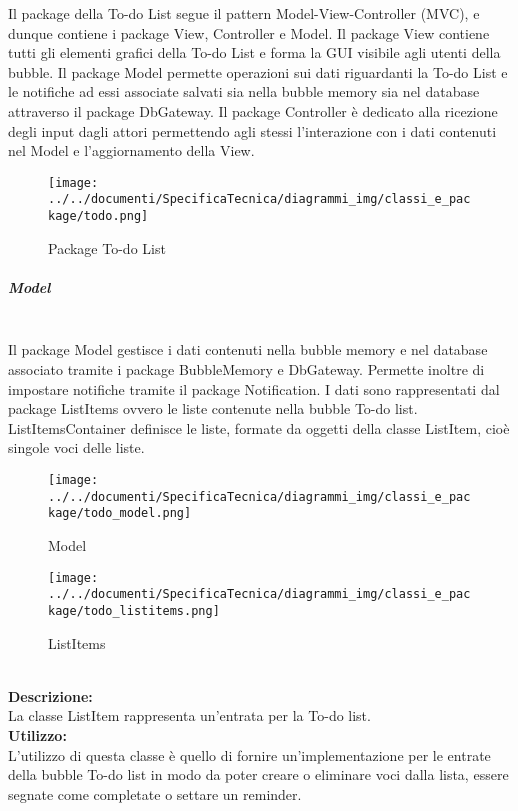 Il package della To-do List segue il pattern Model-View-Controller (MVC), e dunque contiene i package View, Controller e Model. Il package View contiene tutti gli elementi grafici della To-do List e forma la GUI visibile agli utenti della bubble. Il package Model permette operazioni sui dati riguardanti la To-do List e le notifiche ad essi associate salvati sia nella bubble memory sia nel database attraverso il package Db\-Gateway. Il package Controller è dedicato alla ricezione degli input dagli attori permettendo agli stessi l'interazione con i dati contenuti nel Model e l'aggiornamento della View.

\begin{figure}[H]
	\centering
	\texttt{[image: ../../documenti/SpecificaTecnica/diagrammi\_img/classi\_e\_package/todo.png]}
	\caption{Package To-do List}
\end{figure}

\subparagraph{Model}\mbox{}\\
Il package Model gestisce i dati contenuti nella bubble memory e nel database associato tramite i package BubbleMemory e Db\-Gateway. Permette inoltre di impostare notifiche tramite il package Notification. I dati sono rappresentati dal package List\-Items ovvero le liste contenute nella bubble To-do list. List\-Items\-Container definisce le liste, formate da oggetti della classe List\-Item, cioè singole voci delle liste. 
\begin{figure}[H]
	\centering
	\texttt{[image: ../../documenti/SpecificaTecnica/diagrammi\_img/classi\_e\_package/todo\_model.png]}
	\caption{Model}
\end{figure}

\begin{figure}[H]
	\centering
	\texttt{[image: ../../documenti/SpecificaTecnica/diagrammi\_img/classi\_e\_package/todo\_listitems.png]}
	\caption{List\-Items}
\end{figure}

\label{todo-item}\mbox{}\\
\textbf{Descrizione:}\\
La classe List\-Item rappresenta un'entrata per la To-do list.\\
\textbf{Utilizzo:}\\
L'utilizzo di questa classe è quello di fornire un'implementazione per le entrate della bubble To-do list in modo da poter creare o eliminare voci dalla lista, essere segnate come completate o settare un reminder.\\

